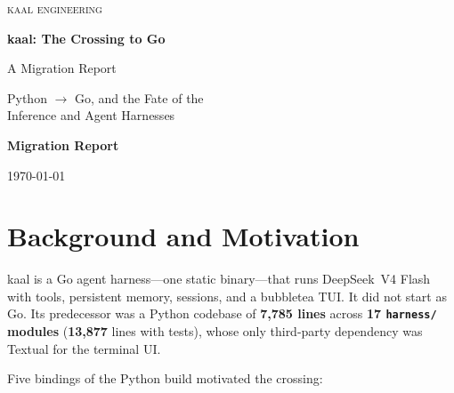 \documentclass[11pt,a4paper]{article}
\begin{document}
\begin{titlepage}
\centering
\vspace*{1.3cm}
{\Large\textsc{kaal engineering}\par}
\vspace{1.2cm}
{\Huge\bfseries kaal: The Crossing to Go\par}
\vspace{0.45cm}
{\Large A Migration Report\par}
\vspace{0.15cm}
{\large Python $\rightarrow$ Go, and the Fate of the\\ Inference and Agent Harnesses\par}
\vfill
{}
\vfill
{\large\textbf{Migration Report}\par}
\vspace{0.2cm}
{\large \today\par}
\end{titlepage}

\tableofcontents
\clearpage

\section{Background and Motivation}

\noindent
kaal is a Go agent harness---one static binary---that runs DeepSeek~V4 Flash with tools, persistent memory, sessions, and a bubbletea TUI. It did not start as Go. Its predecessor was a Python codebase of \textbf{7,785 lines} across \textbf{17 \texttt{harness/} modules} (\textbf{13,877} lines with tests), whose only third-party dependency was Textual for the terminal UI.

Five bindings of the Python build motivated the crossing:
\end{document}
